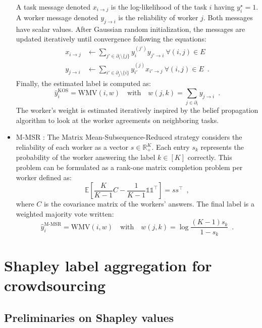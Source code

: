 \documentclass{cap2024}
\begin{document}
\begin{itemize}
  A task message denoted $x_{i\rightarrow j}$ is the log-likelihood of the task $i$ having $y_i^\star=1$.
  A worker message denoted $y_{j\rightarrow i}$ is the reliability of worker $j$.
  Both messages have scalar values.
  After Gaussian random initialization, the messages are updated iteratively until convergence following the equations:
  \begin{align*}
      x_{i\rightarrow j} &\gets \sum_{j'\in \partial_i\setminus \{j\}} y_i^{(j')}y_{j'\rightarrow i} \ \forall (i,j)\in E \\
      y_{j\rightarrow i} &\gets \sum_{i'\in \partial_j\setminus \{i\}} y_{i'}^{(j)} x_{i'\rightarrow j} \ \forall (i,j)\in E\enspace.
  \end{align*}
  Finally, the estimated label is computed as:
  \begin{equation}
    \hat y_i^{\text{KOS}} = \mathrm{WMV}(i, w)\quad \text{with}\quad w(j,k)=\sum_{j\in\partial_i}y_{j\rightarrow i}\enspace.
  \end{equation}
  The worker's weight is estimated iteratively inspired by the belief propagation algorithm to look at the worker agreements on neighboring tasks.
  \item M-MSR \citep{ma2020adversarial}: The Matrix Mean-Subsequence-Reduced strategy considers the reliability of each worker as a vector $s\in\mathbb{R}^K_+$. Each entry $s_k$ represents the probability of the worker answering the label $k\in[K]$ correctly.
  This problem can be formulated as a rank-one matrix completion problem per worker defined as:
  \[\mathbb{E}\left[\frac{K}{K-1}C - \frac{1}{K-1}\mathds{1}\mathds{1}^\top\right]=ss^\top \enspace,\]
  where $C$ is the covariance matrix of the workers' answers.
  The final label is a weighted majority vote written:
  \begin{equation}
    \hat y_i^{\text{M-MSR}} = \mathrm{WMV}(i, w)\quad \text{with}\quad w(j,k)=\log\frac{(K-1)s_k}{1-s_k}\enspace.
  \end{equation}
\end{itemize}

\section{Shapley label aggregation for crowdsourcing}
\label{sec:shapagg}

\subsection{Preliminaries on Shapley values}
\end{document}

